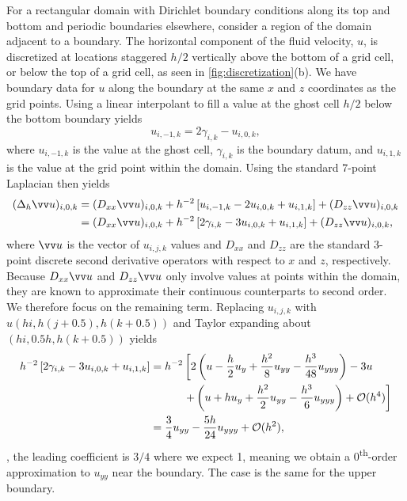 For a rectangular domain with Dirichlet boundary conditions along its top and bottom and periodic boundaries
elsewhere, consider a region of the domain adjacent to a boundary.  The horizontal component of the fluid
velocity, $u$, is discretized at locations staggered $h/2$ vertically above the bottom of a grid cell, or below
the top of a grid cell, as seen in \cref{fig:discretization}(b). We have boundary data for $u$ along the boundary
at the same $x$ and $z$ coordinates as the grid points. Using a linear interpolant to fill a value at the ghost
cell $h/2$ below the bottom boundary yields
\begin{equation}\label{eq:ghost}
    u_{i, -1, k} = 2\gamma_{i, k} - u_{i, 0, k},
\end{equation}
where $u_{i, -1, k}$ is the value at the ghost cell, $\gamma_{i, k}$ is the boundary datum, and $u_{i, 1, k}$ is
the value at the grid point within the domain. Using the standard 7-point Laplacian then yields
\begin{equation}\label{eq:disc-lap}
    \begin{aligned}
        (\laplacian_h \arr{u})_{i, 0, k}
        &= (D_{xx}\arr{u})_{i, 0, k} + h^{-2}\left[u_{i, -1, k} - 2u_{i, 0, k} + u_{i, 1, k}\right] + (D_{zz}\arr{u})_{i, 0, k} \\
        &= (D_{xx}\arr{u})_{i, 0, k} + h^{-2}\left[2\gamma_{i, k} - 3u_{i, 0, k} + u_{i, 1, k}\right] + (D_{zz}\arr{u})_{i, 0, k},
    \end{aligned}
\end{equation}
where $\arr{u}$ is the vector of $u_{i, j, k}$ values and $D_{xx}$ and $D_{zz}$ are the standard 3-point discrete
second derivative operators with respect to $x$ and $z$, respectively. Because $D_{xx}\arr{u}$ and $D_{zz}\arr{u}$
only involve values at points within the domain, they are known to approximate their continuous counterparts to
second order. We therefore focus on the remaining term. Replacing $u_{i, j, k}$ with $u(hi, h(j+0.5), h(k+0.5))$
and Taylor expanding about $(hi, 0.5h, h(k+0.5))$ yields
\begin{equation}\label{eq:expansion}
    \begin{aligned}
    h^{-2}\left[2\gamma_{i, k} - 3u_{i, 0, k} + u_{i, 1, k}\right]
    &= h^{-2}\left[2\left(u - \frac{h}{2}u_y + \frac{h^2}{8}u_{yy} - \frac{h^3}{48}u_{yyy}\right) - 3u\right. \\
    &\hphantom{=h^{-2}[}\left.+ \left(u + hu_y + \frac{h^2}{2}u_{yy} - \frac{h^3}{6}u_{yyy}\right)+\mathcal{O}(h^4)\right] \\
    &= \frac34u_{yy} - \frac{5h}{24}u_{yyy} + \mathcal{O}(h^2),
    \end{aligned}
\end{equation}
, the leading coefficient is $3/4$ where we expect 1, meaning we obtain a 0\textsuperscript{th}-order
approximation to $u_{yy}$ near the boundary. The case is the same for the upper boundary.

